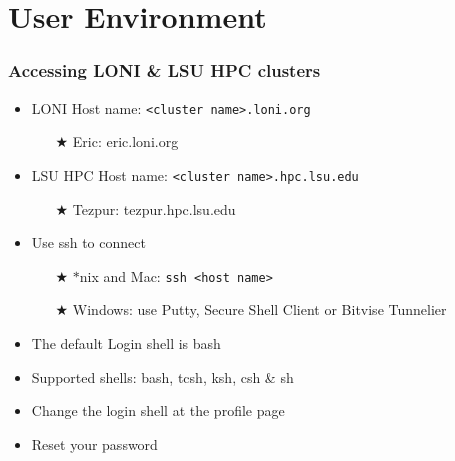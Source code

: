 \documentclass[slidestop,mathserif,compress,xcolor=svgnames,table]{beamer}
\begin{document}
\section{User Environment}
\begin{frame}
\frametitle{\small Accessing LONI \& LSU HPC clusters}
\begin{itemize}
\item LONI Host name: \texttt{<cluster name>.loni.org}
\begin{itemize}
\item[$\bigstar$] Eric: eric.loni.org
\end{itemize}
\item LSU HPC Host name: \texttt{<cluster name>.hpc.lsu.edu}
\begin{itemize}
\item[$\bigstar$] Tezpur: tezpur.hpc.lsu.edu
\end{itemize}
\item Use ssh to connect
\begin{itemize}
\item[$\bigstar$] $\ast$nix and Mac: \texttt{ssh <host name>}
\item[$\bigstar$] Windows: use Putty, Secure Shell Client or Bitvise Tunnelier
\end{itemize}
\item The default Login shell is bash
\item Supported shells: bash, tcsh, ksh, csh \& sh
\item Change the login shell at the profile page
\item Reset your password
\end{itemize}
\end{frame}
\end{document}
